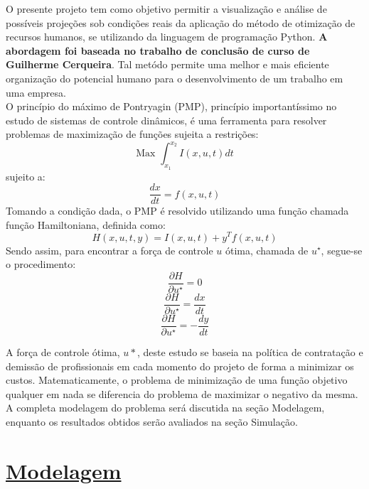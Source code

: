 \documentclass[14pt, oneside]{book}
\theoremstyle{definition}
\begin{document}
     O presente projeto tem como objetivo permitir a visualização e análise de possíveis projeções sob condições reais da aplicação do método de otimização de recursos humanos, se utilizando da linguagem de programação Python. \textbf{A abordagem foi baseada no trabalho de conclusão de curso de Guilherme Cerqueira}. Tal metódo permite uma melhor e mais eficiente organização do potencial humano para o desenvolvimento de um trabalho em uma empresa.\\ %
             
    
    O princípio do máximo de Pontryagin (PMP), princípio importantíssimo no estudo de sistemas de controle dinâmicos, é uma ferramenta para resolver problemas de maximização de funções sujeita a restrições:
            $$\text{Max }\int_{x_1}^{x_2}I(x,u,t)dt$$
             sujeito a:
            $$\frac{dx}{dt}=f(x,u,t)$$
             Tomando a condição dada, o PMP é resolvido utilizando uma função chamada função Hamiltoniana, definida como:
            $$H(x,u,t,y) = I(x,u,t) + y^Tf(x,u,t)$$
             Sendo assim, para encontrar a força de controle $u$ ótima, chamada de $u^\star$, segue-se o procedimento:
            $$\frac{\partial H}{\partial u^\star} = 0$$
            $$\frac{\partial H}{\partial u^\star} = \frac{dx}{dt}$$
            $$\frac{\partial H}{\partial u^\star} = -\frac{dy}{dt}$$
            
    A força de controle ótima, $u*$, deste estudo se baseia na política de contratação e demissão de profissionais em cada momento do projeto de forma a minimizar os custos. Matematicamente, o problema de minimização de uma função objetivo qualquer em nada se diferencia do problema de maximizar o negativo da mesma. A completa modelagem do problema será discutida na seção Modelagem, enquanto os resultados obtidos serão avaliados na seção Simulação.
    
    
            
            
            
            \chapter[Modelagem]{\hyperlink{toc}{Modelagem}}
      
\end{document}
